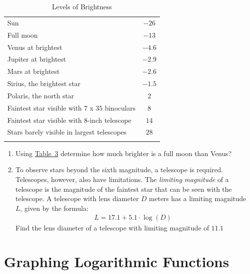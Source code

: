 \documentclass[10pt,]{book}
\theoremstyle{ptxdefinitionnotitle}
\theoremstyle{ptxdefinitiontitle}
\theoremstyle{ptxdefinitionnotitle}
\theoremstyle{ptxdefinitiontitle}
\theoremstyle{ptxdefinitionnotitle}
\theoremstyle{ptxdefinitiontitle}
\numberwithin{equation}{section}
\newcommand{\hrulethick} {\noalign{\hrule height 0.11em}}
\begin{document}
\begin{divisionexercise}{8}
\begin{table}
\begin{tabular}{cc}
\multicolumn{1}{l}{Sun}&\(-26\)\tabularnewline[0pt]
\multicolumn{1}{l}{Full moon}&\(-13\)\tabularnewline[0pt]
\multicolumn{1}{l}{Venus at brightest}&\(-4.6\)\tabularnewline[0pt]
\multicolumn{1}{l}{Jupiter at brightest}&\(-2.9\)\tabularnewline[0pt]
\multicolumn{1}{l}{Mars at brightest}&\(-2.6\)\tabularnewline[0pt]
\multicolumn{1}{l}{Sirius, the brightest star}&\(-1.5\)\tabularnewline[0pt]
\multicolumn{1}{l}{Polaris, the north star}&\(2\)\tabularnewline[0pt]
\multicolumn{1}{l}{Faintest star visible with \(7\) x \(35\) binoculars}&\(8\)\tabularnewline[0pt]
\multicolumn{1}{l}{Faintest star visible with \(8\)-inch telescope}&\(14\)\tabularnewline[0pt]
\multicolumn{1}{l}{Stars barely visible in largest telescopes}&\(28\)\tabularnewline\hrulethick
\end{tabular}
\caption{Levels of Brightness\label{star-chart}}
\end{table}
\hypertarget{p-322}{}%
\leavevmode%
\begin{enumerate}[label=(\alph*)]
\item\hypertarget{li-235}{}Using \hyperref[star-chart]{Table~3} determine how much brighter is a full moon than Venus?%
\item\hypertarget{li-236}{}To observe stars beyond the sixth magnitude, a telescope is required.  Telescopes, however, also have limitations.  The \emph{limiting magnitude} of a telescope is the magnitude of the faintest star that can be seen with the telescope.  A telescope with lens diameter \(D\) meters has a limiting magnitude \(L\), given by the formula:%
\begin{gather*}
L = 17.1 + 5.1 \cdot \log (D)
\end{gather*}
Find the lens diameter of a telescope with limiting magnitude of \(11.1\)%
\end{enumerate}
%
\end{divisionexercise}%
\typeout{************************************************}
\typeout{************************************************}
\section[{Graphing Logarithmic Functions}]{Graphing Logarithmic Functions}\label{chapter05-section03}
\typeout{************************************************}
\typeout{************************************************}
\end{document}
